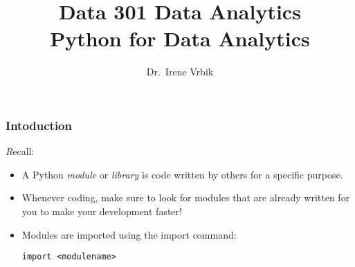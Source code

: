 \documentclass[xcolor=svgnames, colorlinks, handout]{beamer}
\title
  [Data 301 Data Analytics\hspace{2em}]
  {Data 301 Data Analytics\\
Python for Data Analytics}
\author
  [Dr.\ Irene Vrbik]
  {Dr.\ Irene Vrbik}
\date
  {}
\institute
  {University of British Columbia Okanagan \newline irene.vrbik@ubc.ca}
\newcommand{\ft}[1]{\frametitle{#1}}
\begin{document}
\maketitle



\setcounter{theorem}{15}

\begin{frame}[fragile]\ft{Intoduction}
{\textit Recall:}\\
\begin{itemize}
\item A Python \emph{module} or \emph{library} is code written by others for a specific purpose.  
\vfill
\item Whenever coding, make sure to look for modules that are already written for you to make your development faster!
\vfill
\item Modules are imported using the import command:
\begin{Verbatim}[xleftmargin=.5in, frame=single] 
import <modulename>
\end{Verbatim}
\end{itemize}
\end{frame}
\end{document}
